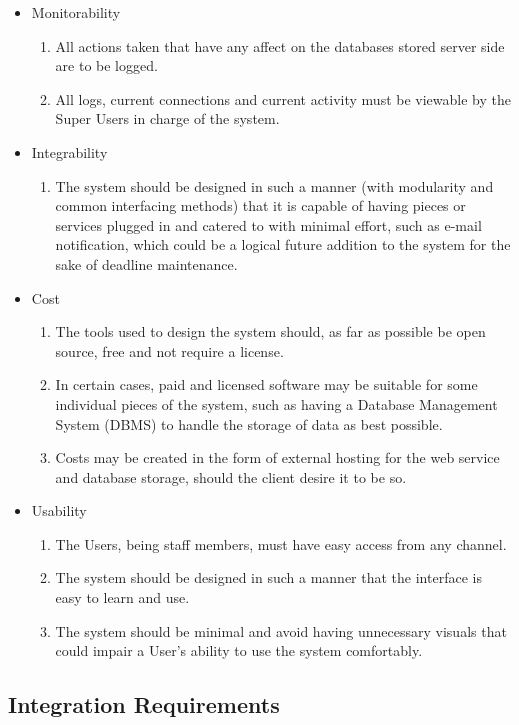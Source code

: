 \documentclass[hidelinks,a4paper,12pt]{article}
\begin{document}
\begin{itemize}
\begin{enumerate}
		\end{enumerate}
		\item Monitorability 
		\begin{enumerate}
			\item All actions taken that have any affect on the databases stored server side are to be logged.
			\item All logs, current connections and current activity must be viewable by the Super Users in charge of the system.
		\end{enumerate}
		\item Integrability
		\begin{enumerate}
			\item The system should be designed in such a manner (with modularity and common interfacing methods) that it is capable of having pieces or services plugged in and catered to with minimal effort, such as e-mail notification, which could be a logical future addition to the system for the sake of deadline maintenance.
		\end{enumerate}
		\item Cost
		\begin{enumerate}
			\item The tools used to design the system should, as far as possible be open source, free and not require a license.
			\item In certain cases, paid and licensed software may be suitable for some individual pieces of the system, such as having a Database Management System (DBMS) to handle the storage of data as best possible.
			\item Costs may be created in the form of external hosting for the web service and database storage, should the client desire it to be so.
		\end{enumerate}
		\item Usability
		\begin{enumerate}
			\item The Users, being staff members, must have easy access from any channel.
			\item The system should be designed in such a manner that the interface is easy to learn and use.
			\item The system should be minimal and avoid having unnecessary visuals that could impair a User's ability to use the system comfortably.
		\end{enumerate}
	\end{itemize}
	
	
	\subsection{Integration Requirements}
	
\end{document}

